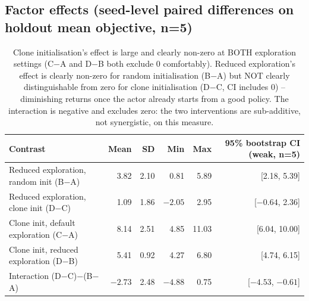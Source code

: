 \subsection*{Factor effects (seed-level paired differences on holdout mean objective, n=5)}
\begin{table}[h]
\centering
\begin{tabular}{lrrrrr}
\hline
Contrast & Mean & SD & Min & Max & 95\% bootstrap CI (weak, n=5) \\
\hline
Reduced exploration, random init (B$-$A) & 3.82 & 2.10 & 0.81 & 5.89 & [2.18, 5.39] \\
Reduced exploration, clone init (D$-$C)  & 1.09 & 1.86 & $-2.05$ & 2.95 & [$-0.64$, 2.36] \\
Clone init, default exploration (C$-$A)  & 8.14 & 2.51 & 4.85 & 11.03 & [6.04, 10.00] \\
Clone init, reduced exploration (D$-$B)  & 5.41 & 0.92 & 4.27 & 6.80 & [4.74, 6.15] \\
Interaction (D$-$C)$-$(B$-$A)            & $-2.73$ & 2.48 & $-4.88$ & 0.75 & [$-4.53$, $-0.61$] \\
\hline
\end{tabular}
\caption{Clone initialisation's effect is large and clearly non-zero at BOTH exploration
settings (C$-$A and D$-$B both exclude 0 comfortably). Reduced exploration's effect is clearly
non-zero for random initialisation (B$-$A) but NOT clearly distinguishable from zero for clone
initialisation (D$-$C, CI includes 0) -- diminishing returns once the actor already starts from a
good policy. The interaction is negative and excludes zero: the two interventions are
sub-additive, not synergistic, on this measure.}
\end{table}
